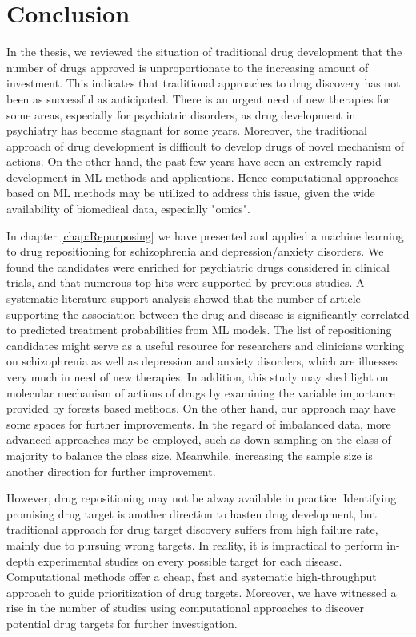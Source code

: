 \chapter{Conclusion}
  In the thesis, we reviewed the situation of traditional drug development that the number of drugs approved is unproportionate to the increasing amount of investment. This indicates that traditional approaches to drug discovery has not been as successful as anticipated. There is an urgent need of new therapies for some areas, especially for psychiatric disorders, as drug development in psychiatry has become stagnant for some years. Moreover, the traditional approach of drug development is difficult to develop drugs of novel mechanism of actions. On the other hand, the past few years have seen an extremely rapid development in ML methods and applications. Hence computational approaches based on ML methods may be utilized to address this issue, given the wide availability of biomedical data, especially "omics".

  In chapter \ref{chap:Repurposing} we have presented and applied a machine learning to drug repositioning for schizophrenia and depression/anxiety disorders. We found the candidates were enriched for psychiatric drugs considered in clinical trials, and that numerous top hits were supported by previous studies. A systematic literature support analysis showed that the number of article supporting the association between the drug and disease is significantly correlated to predicted treatment probabilities from ML models. The list of repositioning candidates might serve as a useful resource for researchers and clinicians working on schizophrenia as well as depression and anxiety disorders, which are illnesses very much in need of new therapies. In addition, this study may shed light on molecular mechanism of actions of drugs by examining the variable importance provided by forests based methods. On the other hand, our approach may have some spaces for further improvements. In the regard of imbalanced data, more advanced approaches may be employed, such as down-sampling on the class of majority to balance the class size. Meanwhile, increasing the sample size is another direction for further improvement. 
  
  However, drug repositioning may not be alway available in practice. Identifying promising drug target is another direction to hasten drug development, but traditional approach for drug target discovery suffers from high failure rate, mainly due to pursuing wrong targets. In reality, it is impractical to perform in-depth experimental studies on every possible target for each disease. Computational methods offer a cheap, fast and systematic high-throughput approach to guide prioritization of drug targets. Moreover, we have witnessed a rise in the number of studies using computational approaches to discover potential drug targets for further investigation.
  
